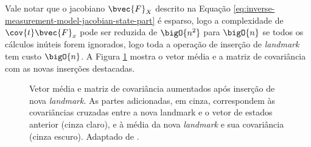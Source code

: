Vale notar que o jacobiano $\bvec{F}_X$ descrito na Equação \ref{eq:inverse-measurement-model-jacobian-state-part} é esparso, logo a complexidade de $\cov{t}\bvec{F}_x$ pode ser reduzida de $\bigO{n^2}$ para $\bigO{n}$ se todos os cálculos inúteis forem ignorados, logo toda a operação de inserção de \textit{landmark} tem custo $\bigO{n}$. A Figura \ref{fig:ekf-slam-landmark-insertion} mostra o vetor média e a matriz de covariância com as novas inserções destacadas.

\begin{figure}[h]
  \centering
  
  \caption{Vetor média e matriz de covariância aumentados após inserção de nova \textit{landmark}. As partes adicionadas, em cinza, correspondem às covariâncias cruzadas entre a nova landmark e o vetor de estados anterior (cinza claro), e à média da nova \textit{landmark} e sua covariância (cinza escuro). Adaptado de \cite[p.~11]{jsola}.}
  \label{fig:ekf-slam-landmark-insertion}
\end{figure}

